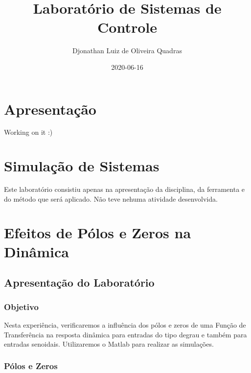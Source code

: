\documentclass[
]{book}
\title{Laboratório de Sistemas de Controle}
\author{Djonathan Luiz de Oliveira Quadras}
\date{2020-06-16}
\begin{document}
\maketitle

{
\setcounter{tocdepth}{1}
\tableofcontents
}
\hypertarget{apresentauxe7uxe3o}{%
\chapter*{Apresentação}\label{apresentauxe7uxe3o}}

Working on it :)

\hypertarget{simulauxe7uxe3o-de-sistemas}{%
\chapter{Simulação de Sistemas}\label{simulauxe7uxe3o-de-sistemas}}

Este laboratório consistiu apenas na apresentação da disciplina, da ferramenta e do método que será aplicado. Não teve nehuma atividade desenvolvida.

\hypertarget{efeitos-de-puxf3los-e-zeros-na-dinuxe2mica}{%
\chapter{Efeitos de Pólos e Zeros na Dinâmica}\label{efeitos-de-puxf3los-e-zeros-na-dinuxe2mica}}

\hypertarget{apresentauxe7uxe3o-do-laboratuxf3rio}{%
\section{Apresentação do Laboratório}\label{apresentauxe7uxe3o-do-laboratuxf3rio}}

\hypertarget{objetivo}{%
\subsection{Objetivo}\label{objetivo}}

Nesta experiência, verificaremos a influência dos pólos e zeros de uma Função de Transferência na resposta dinâmica para entradas do tipo degrau e também para entradas senoidais. Utilizaremos o Matlab para realizar as
simulações.

\hypertarget{puxf3los-e-zeros}{%
\subsection{Pólos e Zeros}\label{puxf3los-e-zeros}}
\end{document}
